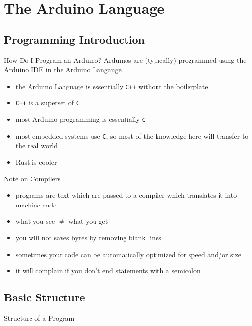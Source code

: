 \documentclass{beamer}
\newcommand{\cee}{\texttt{C}\xspace}
\newcommand{\cxx}{\texttt{C++}\xspace}
\newcommand{\examplefile}[1]{
	
}
\begin{document}
	\section{The Arduino Language}
	\subsection{Programming Introduction}
	\begin{frame}{How Do I Program an Arduino?}
		Arduinos are (typically) programmed using the Arduino IDE in the Arduino Langauge
		\begin{itemize}
			\item the Arduino Language is essentially \cxx without the boilerplate
			\item \cxx is a superset of \cee
			\item most Arduino programming is essentially \cee
			\item most embedded systems use \cee, so most of the knowledge here will transfer to the real world
			\item \sout{Rust is cooler}
		\end{itemize}
	\end{frame}

	\begin{frame}{Note on Compilers}
		\begin{itemize}
			\item programs are text which are passed to a compiler which translates it into machine code
			\item what you see $\neq$ what you get
			\item you will not saves bytes by removing blank lines
			\item sometimes your code can be automatically optimized for speed and/or size
			\item it will complain if you don't end statements with a semicolon
		\end{itemize}
	\end{frame}

	\subsection{Basic Structure}
	\begin{frame}[fragile]{Structure of a Program}
		\examplefile{structure.cxx}
	\end{frame}
\end{document}
